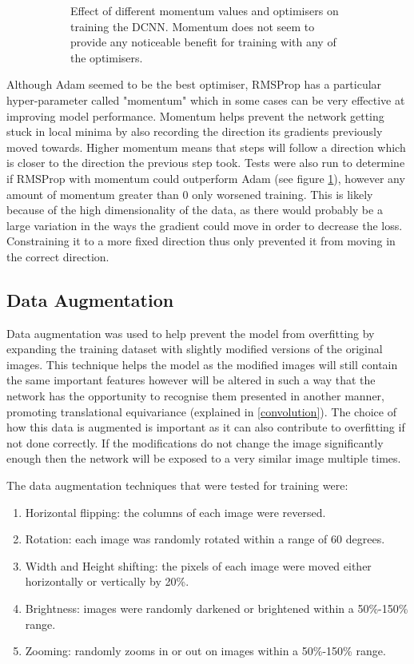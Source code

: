 \documentclass{l4proj}
\begin{document}
\begin{figure}[H]
\begin{subfigure}[t]{0.48\textwidth}
        \caption{Effect of different momentum values and optimisers on training the DCNN. Momentum does not seem to provide any noticeable benefit for training with any of the optimisers.}
        \label{fig:momentum}
    \end{subfigure} 
    \caption{}
    \label{fig:hyperparameters}
\end{figure}

Although Adam seemed to be the best optimiser, RMSProp has a particular hyper-parameter called "momentum" which in some cases can be very effective at improving model performance. Momentum helps prevent the network getting stuck in local minima by also recording the direction its gradients previously moved towards. Higher momentum means that steps will follow a direction which is closer to the direction the previous step took. Tests were also run to determine if RMSProp with momentum could outperform Adam (see figure \ref{fig:momentum}), however any amount of momentum greater than 0 only worsened training. This is likely because of the high dimensionality of the data, as there would probably be a large variation in the ways the gradient could move in order to decrease the loss. Constraining it to a more fixed direction thus only prevented it from moving in the correct direction.

\subsection{Data Augmentation}
Data augmentation was used to help prevent the model from overfitting by expanding the training dataset with slightly modified versions of the original images. This technique helps the model as the modified images will still contain the same important features however will be altered in such a way that the network has the opportunity to recognise them presented in another manner, promoting translational equivariance (explained in \ref{convolution}). The choice of how this data is augmented is important as it can also contribute to overfitting if not done correctly. If the modifications do not change the image significantly enough then the network will be exposed to a very similar image multiple times. 

The data augmentation techniques that were tested for training were:
\begin{enumerate}
    \item Horizontal flipping: the columns of each image were reversed.
    \item Rotation: each image was randomly rotated within a range of 60 degrees.
    \item Width and Height shifting: the pixels of each image were moved either horizontally or vertically by 20\%.
    \item Brightness: images were randomly darkened or brightened within a 50\%-150\% range.
    \item Zooming: randomly zooms in or out on images within a 50\%-150\% range.
\end{enumerate}
\end{document}
